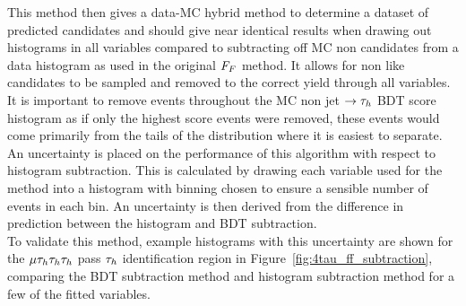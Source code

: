 This method then gives a data-\ac{MC} hybrid method to determine a dataset of predicted \jtth candidates and should give near identical results when drawing out histograms in all variables compared to subtracting off \ac{MC} non \jtth candidates from a data histogram as used in the original $F_{F}$ method.
It allows for non \jtth like candidates to be sampled and removed to the correct yield through all variables.
It is important to remove events throughout the \ac{MC} non jet $\rightarrow\tau_{h}$ \ac{BDT} score histogram as if only the highest score events were removed, these events would come primarily from the tails of the distribution where it is easiest to separate. \\

An uncertainty is placed on the performance of this algorithm with respect to histogram subtraction.
This is calculated by drawing each variable used for the method into a histogram with binning chosen to ensure a sensible number of events in each bin.
An uncertainty is then derived from the difference in prediction between the histogram and \ac{BDT} subtraction. \\

To validate this method, example histograms with this uncertainty are shown for the $\mu\tau_{h}\tau_{h}\tau_{h}$ pass $\tau_{h}$ identification region in Figure~\ref{fig:4tau_ff_subtraction}, comparing the \ac{BDT} subtraction method and histogram subtraction method for a few of the fitted variables. \\

